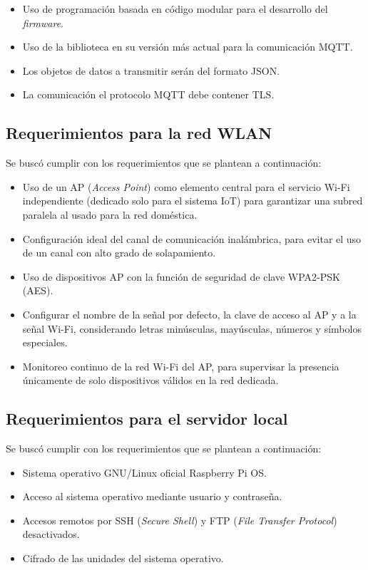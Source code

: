 \begin{itemize}
\item Uso de programación basada en código modular para el desarrollo del \emph{firmware}.
\item Uso de la biblioteca en su versión más actual para la comunicación MQTT.
\item Los objetos de datos a transmitir serán del formato JSON.
\item La comunicación el protocolo MQTT debe contener TLS.
\end{itemize}

\subsection{Requerimientos para la red WLAN}
Se buscó cumplir con los requerimientos que se plantean a continuación:

\begin{itemize}
\item Uso de un AP (\emph{Access Point}) como elemento central para el servicio Wi-Fi independiente (dedicado solo para el sistema IoT) para garantizar una subred paralela al usado para la red doméstica.
\item Configuración ideal del canal de comunicación inalámbrica, para evitar el uso de un canal con alto grado de solapamiento.
\item Uso de dispositivos AP con la función de seguridad de clave WPA2-PSK (AES).
\item Configurar el nombre de la señal por defecto, la clave de acceso al AP y a la señal Wi-Fi, considerando letras minúsculas, mayúsculas, números y símbolos especiales.
\item Monitoreo continuo de la red Wi-Fi del AP, para supervisar la presencia únicamente de solo dispositivos válidos en la red dedicada.
\end{itemize}


\subsection{Requerimientos para el servidor local}
Se buscó cumplir con los requerimientos que se plantean a continuación:

\begin{itemize}
\item Sistema operativo GNU/Linux oficial Raspberry Pi OS.
\item Acceso al sistema operativo mediante usuario y contraseña.
\item Accesos remotos por SSH (\emph{Secure Shell}) y FTP (\emph{File Transfer Protocol})  desactivados.
\item Cifrado de las unidades del sistema operativo.
\end{itemize}

